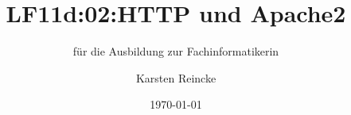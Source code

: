 \documentclass[]{beamer}
\title{LF11d:02:HTTP und Apache2}
\subtitle{für die Ausbildung zur Fachinformatikerin}
\institute{GS-LDK}
\author{Karsten Reincke}
\date{\today}
\def\cfgGl{../../../cfg.gl/}
\begin{document}

\begin{frame}
  \titlepage

  
\end{frame}






\logo{}
\newpage



%
\end{document}
